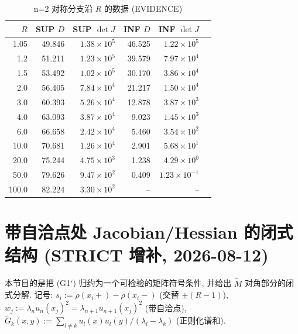\documentclass[UTF8]{ctexart}
\begin{document}
\begin{table}[ht]
\centering
\caption{n=2 对称分支沿 $R$ 的数据 (EVIDENCE)}
\begin{tabular}{rrrrrr}
\toprule
$R$ & SUP $D$ & SUP $\det J$ & INF $D$ & INF $\det J$ \\
\midrule
1.05 & 49.846 & $1.38\times10^5$ & 46.525 & $1.22\times10^5$ \\
1.2  & 51.211 & $1.23\times10^5$ & 39.579 & $7.97\times10^4$ \\
1.5  & 53.492 & $1.02\times10^5$ & 30.170 & $3.86\times10^4$ \\
2.0  & 56.405 & $7.84\times10^4$ & 21.217 & $1.50\times10^4$ \\
3.0  & 60.393 & $5.26\times10^4$ & 12.878 & $3.87\times10^3$ \\
4.0  & 63.093 & $3.87\times10^4$ & 9.023  & $1.45\times10^3$ \\
6.0  & 66.658 & $2.42\times10^4$ & 5.460  & $3.54\times10^2$ \\
10.0 & 70.681 & $1.26\times10^4$ & 2.901  & $5.68\times10^1$ \\
20.0 & 75.244 & $4.75\times10^3$ & 1.238  & $4.29\times10^0$ \\
50.0 & 79.626 & $9.47\times10^2$ & 0.409  & $1.23\times10^{-1}$ \\
100.0& 82.224 & $3.30\times10^2$ & -- & -- \\
\bottomrule
\end{tabular}
\end{table}


\section{带自洽点处 Jacobian/Hessian 的闭式结构 (STRICT 增补, 2026-08-12)}\label{sec:aug}

本节目的是把 (G1$'$) 归约为一个可检验的矩阵符号条件, 并给出
$\tilde M$ 对角部分的闭式分解. 记号: $s_i:=\rho(x_i+)-\rho(x_i-)$
(交替 $\pm(R-1)$), $w_j:=\lambda_nu_n(x_j)^2=\lambda_{n+1}u_{n+1}(x_j)^2$
(带自洽点), $\tilde G_k(x,y):=\sum_{l\ne k}u_l(x)u_l(y)/(\lambda_l-\lambda_k)$
(正则化谱和).
\end{document}
